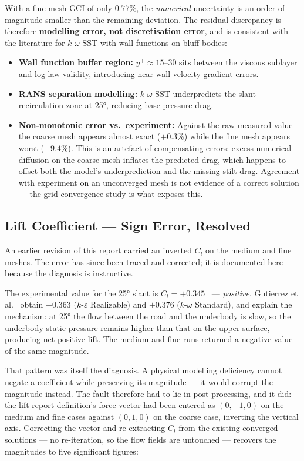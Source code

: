 \documentclass[12pt,a4paper]{article}
\begin{document}
With a fine-mesh $\text{GCI}$ of only $0.77\%$, the \emph{numerical} uncertainty is an order of
magnitude smaller than the remaining deviation. The residual discrepancy is therefore
\textbf{modelling error, not discretisation error}, and is consistent with the literature for
$k$-$\omega$ SST with wall functions on bluff bodies:
\begin{itemize}
  \item \textbf{Wall function buffer region:} $y^+\approx15$–$30$ sits between the viscous sublayer and log-law validity, introducing near-wall velocity gradient errors.
  \item \textbf{RANS separation modelling:} $k$-$\omega$ SST underpredicts the slant recirculation zone at 25°, reducing base pressure drag.
  \item \textbf{Non-monotonic error vs.\ experiment:} Against the raw measured value the coarse mesh
  appears almost exact ($+0.3\%$) while the fine mesh appears worst ($-9.4\%$). This is an artefact
  of compensating errors: excess numerical diffusion on the coarse mesh inflates the predicted drag,
  which happens to offset both the model's underprediction and the missing stilt drag. Agreement
  with experiment on an unconverged mesh is not evidence of a correct solution — the grid
  convergence study is what exposes this.
\end{itemize}

\subsection{Lift Coefficient — Sign Error, Resolved}
\label{sec:cl_disc}

An earlier revision of this report carried an inverted $C_l$ on the medium and fine meshes. The
error has since been traced and corrected; it is documented here because the diagnosis is
instructive.

The experimental value for the 25° slant is $C_l = +0.345$~\cite{meile2011} — \emph{positive}.
Gutierrez et al.~\cite{gutierrez2020} obtain $+0.363$ ($k$-$\varepsilon$ Realizable) and $+0.376$
($k$-$\omega$ Standard), and explain the mechanism: at 25° the flow between the road and the
underbody is slow, so the underbody static pressure remains higher than that on the upper surface,
producing net positive lift. The medium and fine runs returned a negative value of the same
magnitude.

That pattern was itself the diagnosis. A physical modelling deficiency cannot negate a coefficient
while preserving its magnitude — it would corrupt the magnitude instead. The fault therefore had to
lie in post-processing, and it did: the lift report definition's force vector had been entered as
$(0,-1,0)$ on the medium and fine cases against $(0,1,0)$ on the coarse case, inverting the vertical
axis. Correcting the vector and re-extracting $C_l$ from the existing converged solutions — no
re-iteration, so the flow fields are untouched — recovers the magnitudes to five significant figures:
\end{document}

